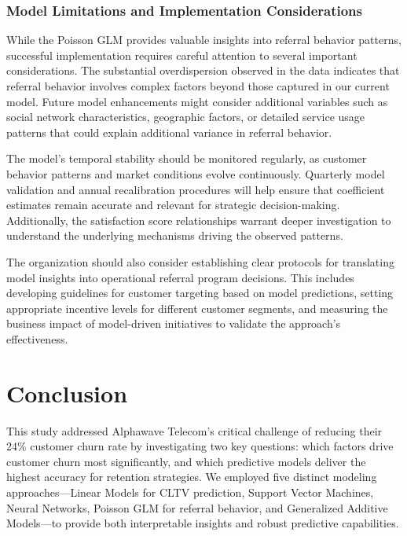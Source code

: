 \documentclass[
]{article}
\begin{document}
\hypertarget{model-limitations-and-implementation-considerations}{%
\subsubsection{Model Limitations and Implementation
Considerations}\label{model-limitations-and-implementation-considerations}}

While the Poisson GLM provides valuable insights into referral behavior
patterns, successful implementation requires careful attention to
several important considerations. The substantial overdispersion
observed in the data indicates that referral behavior involves complex
factors beyond those captured in our current model. Future model
enhancements might consider additional variables such as social network
characteristics, geographic factors, or detailed service usage patterns
that could explain additional variance in referral behavior.

The model's temporal stability should be monitored regularly, as
customer behavior patterns and market conditions evolve continuously.
Quarterly model validation and annual recalibration procedures will help
ensure that coefficient estimates remain accurate and relevant for
strategic decision-making. Additionally, the satisfaction score
relationships warrant deeper investigation to understand the underlying
mechanisms driving the observed patterns.

The organization should also consider establishing clear protocols for
translating model insights into operational referral program decisions.
This includes developing guidelines for customer targeting based on
model predictions, setting appropriate incentive levels for different
customer segments, and measuring the business impact of model-driven
initiatives to validate the approach's effectiveness.

\hypertarget{conclusion}{%
\section{Conclusion}\label{conclusion}}

This study addressed Alphawave Telecom's critical challenge of reducing
their 24\% customer churn rate by investigating two key questions: which
factors drive customer churn most significantly, and which predictive
models deliver the highest accuracy for retention strategies. We
employed five distinct modeling approaches---Linear Models for CLTV
prediction, Support Vector Machines, Neural Networks, Poisson GLM for
referral behavior, and Generalized Additive Models---to provide both
interpretable insights and robust predictive capabilities.
\end{document}
